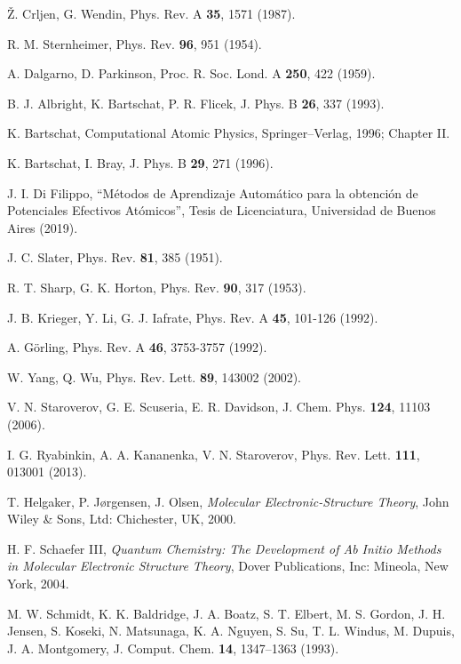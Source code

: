 \begin{thebibliography}{9}
{\v Z}. Crljen, G. Wendin,
Phys. Rev. A \textbf{35}, 1571 (1987).

R. M. Sternheimer, 
Phys. Rev. \textbf{96}, 951 (1954).

A. Dalgarno, D. Parkinson,
Proc. R. Soc. Lond. A \textbf{250}, 422 (1959).

B. J. Albright, K. Bartschat, P. R. Flicek,
J. Phys. B \textbf{26}, 337 (1993).

K. Bartschat, 
Computational Atomic Physics,
Springer--Verlag, 1996; Chapter II.

K. Bartschat, I. Bray, 
J. Phys. B \textbf{29}, 271 (1996).

J. I. Di Filippo,
``Métodos de Aprendizaje Automático para la obtención de Potenciales 
Efectivos Atómicos'', Tesis de Licenciatura, Universidad de Buenos Aires
(2019).



J. C. Slater, 
Phys. Rev. \textbf{81}, 385 (1951).

R. T. Sharp, G. K. Horton,
Phys. Rev. \textbf{90}, 317 (1953).

J. B. Krieger, Y. Li, G. J. Iafrate, 
Phys. Rev. A \textbf{45}, 101-126 (1992).

A. G\"orling,
Phys. Rev. A \textbf{46}, 3753-3757 (1992).

W. Yang, Q. Wu,
Phys. Rev. Lett. \textbf{89}, 143002 (2002).

V. N. Staroverov, G. E. Scuseria, E. R. Davidson,
J. Chem. Phys. \textbf{124}, 11103 (2006).

I. G. Ryabinkin, A. A. Kananenka, V. N. Staroverov,
Phys. Rev. Lett. \textbf{111}, 013001 (2013).

T. Helgaker, P. J{\o}rgensen, J. Olsen,
\textit{Molecular Electronic-Structure Theory},
John Wiley {\&} Sons, Ltd: Chichester, UK, 2000.

H. F. Schaefer III,
\textit{Quantum Chemistry: The Development of Ab Initio Methods in
Molecular Electronic Structure Theory},
Dover Publications, Inc: Mineola, New York, 2004.


M. W. Schmidt, K. K. Baldridge, J. A. Boatz, S. T. Elbert, M. S. Gordon, 
J. H. Jensen, S. Koseki, N. Matsunaga, K. A. Nguyen, S. Su, T. L. Windus, 
M. Dupuis, J. A. Montgomery, 
J. Comput. Chem. \textbf{14}, 1347--1363 (1993).


\end{thebibliography}
